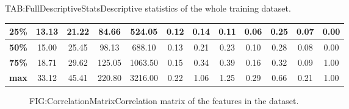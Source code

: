\begin{landscape}
\begin{table}[Complete Descriptive Statistics]{TAB:FullDescriptiveStats}{Descriptive statistics of the whole training dataset.}
\begin{adjustbox}{width=1\linewidth}
\begin{tabular}{|c|*{11}{c|}}
                \hline
                \textbf{25\%}    & 13.13                           & 21.22                            & 84.66                              & 524.05                        & 0.12                                & 0.14                                 & 0.11                               & 0.06                                    & 0.25                              & 0.07                                       & 0.00                      \\
                \hline
                \textbf{50\%}    & 15.00                           & 25.45                            & 98.13                              & 688.10                        & 0.13                                & 0.21                                 & 0.23                               & 0.10                                    & 0.28                              & 0.08                                       & 0.00                      \\
                \hline
                \textbf{75\%}    & 18.71                           & 29.62                            & 125.05                             & 1063.50                       & 0.15                                & 0.34                                 & 0.39                               & 0.16                                    & 0.32                              & 0.09                                       & 1.00                      \\
                \hline
                \textbf{max}     & 33.12                           & 45.41                            & 220.80                             & 3216.00                       & 0.22                                & 1.06                                 & 1.25                               & 0.29                                    & 0.66                              & 0.21                                       & 1.00                      \\
                \hline
            \end{tabular}
        \end{adjustbox}

    \end{table}


\end{landscape}

\begin{figure}[Correlation Matrix]{FIG:CorrelationMatrix}{Correlation matrix of the features in the dataset.}
    \begin{adjustbox}{width=1\textwidth,height=\textheight,keepaspectratio}
    \end{adjustbox}
\end{figure}


